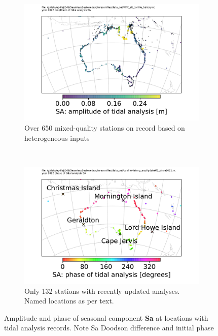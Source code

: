 \begin{figure}[H]\centering
    \begin{subfigure}[b]{\figwidthBig}
        \includegraphics[trim={0 0 0 1cm},clip,width=\textwidth]{figures/maps/locations_SaAmp.pdf} 
        \caption{Over 650 mixed-quality stations on record based on heterogeneous inputs}
    \end{subfigure}
    \\
    \begin{subfigure}[b]{\figwidthBig}
        \includegraphics[trim={0 0 0 1cm},clip,width=\textwidth]{figures/maps/locations_SaPhaAnyM2Update.pdf} 
        \caption{Only 132 stations with recently updated analyses. Named locations as per text.}
    \end{subfigure}
    \caption{Amplitude and phase of seasonal component \textbf{Sa} at locations with tidal analysis records.  Note Sa Doodson difference and initial phase \citep[10.4]{PCTMSL-sp9}}
    \label{fig:SaAmp}
\end{figure}   

